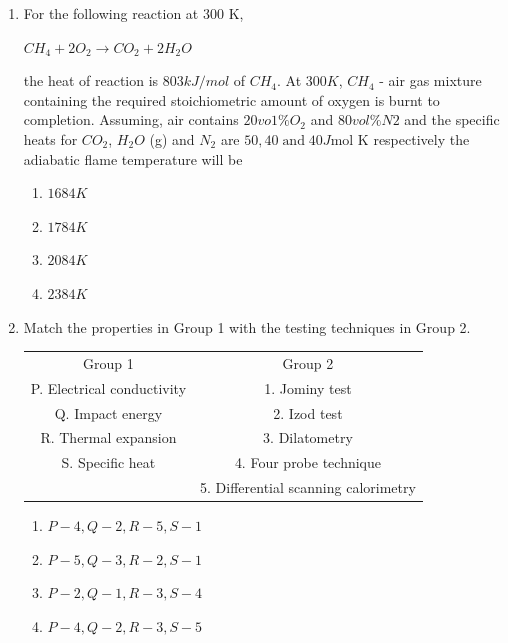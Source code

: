 \documentclass[journal]{IEEEtran}
\theoremstyle{remark}
\begin{document}
\begin{enumerate}
\item  For the following reaction at 300 K,\\
\begin{center}
    

$CH_4 + 2O_2 \longrightarrow CO_2 + 2H_2O $
\end{center}
the heat of reaction is $803 kJ/mol$ of $CH_4$. At $300 K$, $CH_4$ - air gas mixture containing the required stoichiometric amount of oxygen is burnt to completion. Assuming, air contains $20 vo1\% O_2$ and
$80 vol\% N2$ and the specific heats for $CO_2$, $H_2O$ (g) and $N_2$ are $50, 40 \;\text{and}\; 40 J \text{mol K}$ respectively the adiabatic flame temperature will be
 \hfill{}
\begin{multicols}{4}
\begin{enumerate}
\item  $1684 K$
\item $1784 K$
\item  $2084 K$
\item  $2384 K$
\end{enumerate}
\end{multicols}

\item   Match the properties in Group 1 with the testing techniques in Group 2.
\hfill{}
\begin{center}
    \begin{tabular}{c c}
    Group 1     &Group 2  \\
   P. Electrical conductivity      & 1. Jominy test\\
   Q. Impact energy &2. Izod test\\
   R. Thermal expansion&3. Dilatometry\\
   S. Specific heat&4. Four probe technique\\
     &5. Differential scanning calorimetry


    \end{tabular}
\end{center}
\begin{multicols}{2}
\begin{enumerate}   
\item $P-4, Q-2, R-5, S-1$
\item $P-5, Q-3, R-2, S-1$
\item  $P-2, Q-1, R-3, S-4$
\item  $P-4, Q-2, R-3, S-5$
\end{enumerate}
\end{multicols}


\end{enumerate}
\end{document}

